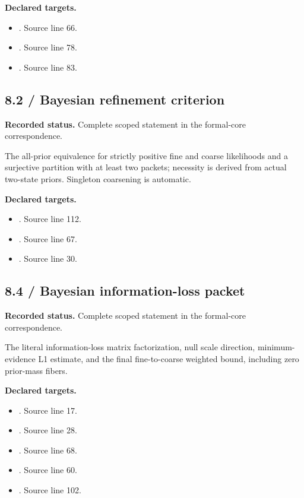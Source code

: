 \textbf{Declared targets.}\begin{itemize}
\item {}. Source line 66.
\item {}. Source line 78.
\item {}. Source line 83.
\end{itemize}
\subsection{8.2 / Bayesian refinement criterion}
\label{result:8.2}
\textbf{Recorded status.} Complete scoped statement in the formal-core correspondence.\par
The all-prior equivalence for strictly positive fine and coarse likelihoods and a surjective partition with at least two packets; necessity is derived from actual two-state priors. Singleton coarsening is automatic.

\textbf{Declared targets.}\begin{itemize}
\item {}. Source line 112.
\item {}. Source line 67.
\item {}. Source line 30.
\end{itemize}
\subsection{8.4 / Bayesian information-loss packet}
\label{result:8.4}
\textbf{Recorded status.} Complete scoped statement in the formal-core correspondence.\par
The literal information-loss matrix factorization, null scale direction, minimum-evidence L1 estimate, and the final fine-to-coarse weighted bound, including zero prior-mass fibers.

\textbf{Declared targets.}\begin{itemize}
\item {}. Source line 17.
\item {}. Source line 28.
\item {}. Source line 68.
\item {}. Source line 60.
\item {}. Source line 102.
\end{itemize}

